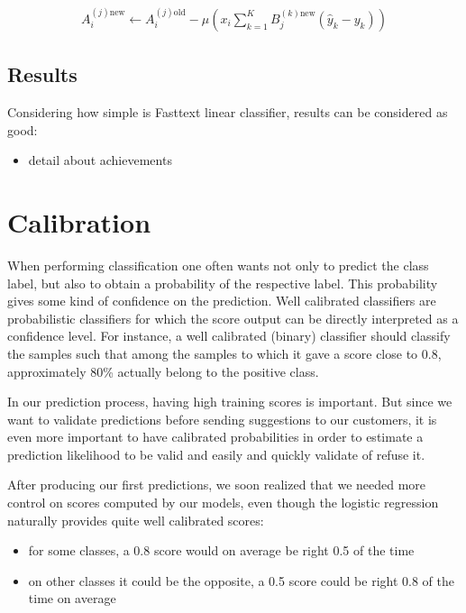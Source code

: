 \begin{align}
	A_i^{(j)\mbox{new}} \leftarrow A_i^{(j)\mbox{old}} - 
	\mu 
	\left(
		x_i \sum_{k=1}^K B_j^{(k)\mbox{new}} (\hat y_k - y_k) 
	\right)
\end{align}

\subsection{Results}

Considering how simple is Fasttext linear classifier, results can be considered as good:
\begin{itemize}
	\item detail about achievements
\end{itemize}

\pagebreak
\section{Calibration}

When performing classification one often wants not only to predict the class label, but also to obtain a probability of the respective label. This probability gives some kind of confidence on the prediction.
Well calibrated classifiers are probabilistic classifiers for which the score output can be directly interpreted as a confidence level. For instance, a well calibrated (binary) classifier should classify the samples such that among the samples to which it gave a score close to 0.8, approximately 80\% actually belong to the positive class.

In our prediction process, having high training scores is important. But since we want to validate predictions before sending suggestions to our customers, it is even more important to have calibrated probabilities in order to estimate a prediction likelihood to be valid and easily and quickly validate of refuse it.

After producing our first predictions, we soon realized that we needed more control on scores computed by our models, even though the logistic regression naturally provides quite well calibrated scores:
\begin{itemize}
	\item for some classes, a 0.8 score would on average be right 0.5 of the time
	\item on other classes it could be the opposite, a 0.5 score could be right 0.8 of the time on average
\end{itemize}


